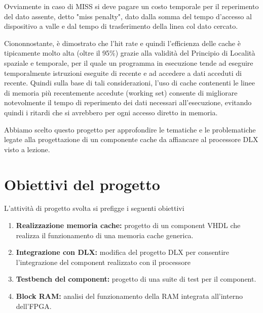 Ovviamente in caso di MISS si deve pagare un costo temporale per il reperimento del dato assente, detto "miss penalty", dato dalla somma del tempo d'accesso al dispositivo a valle e dal tempo di trasferimento della linea col dato cercato.

Ciononnostante, \`e dimostrato che l'hit rate e quindi l'efficienza delle cache \`e tipicamente molto alta (oltre il 95\%) grazie alla validit\`a del Principio di Localit\`a spaziale e temporale, per il quale un programma in esecuzione tende ad eseguire temporalmente istruzioni eseguite di recente e ad accedere a dati acceduti di recente.
Quindi sulla base di tali considerazioni, l'uso di cache contenenti le linee di memoria pi\`u recentemente accedute (working set) consente di migliorare notevolmente il tempo di reperimento dei dati necessari all'esecuzione, evitando quindi i ritardi che si avrebbero per ogni accesso diretto in memoria.

Abbiamo scelto questo progetto per approfondire le tematiche e le problematiche legate alla progettazione di un componente cache da affiancare al processore DLX visto a lezione.

\section{Obiettivi del progetto}
L'attivit\`a di progetto svolta si prefigge i seguenti obiettivi

\begin{enumerate}

\item \textbf{Realizzazione memoria cache:} progetto di un component VHDL che realizza il funzionamento di una memoria cache generica.

\item \textbf{Integrazione con DLX:} modifica del progetto DLX per consentire l'integrazione del component realizzato con il processore

\item \textbf{Testbench del component:} progetto di una suite di test per il component.

\item \textbf{Block RAM:} analisi del funzionamento della RAM integrata all'interno dell'FPGA.

\end{enumerate}